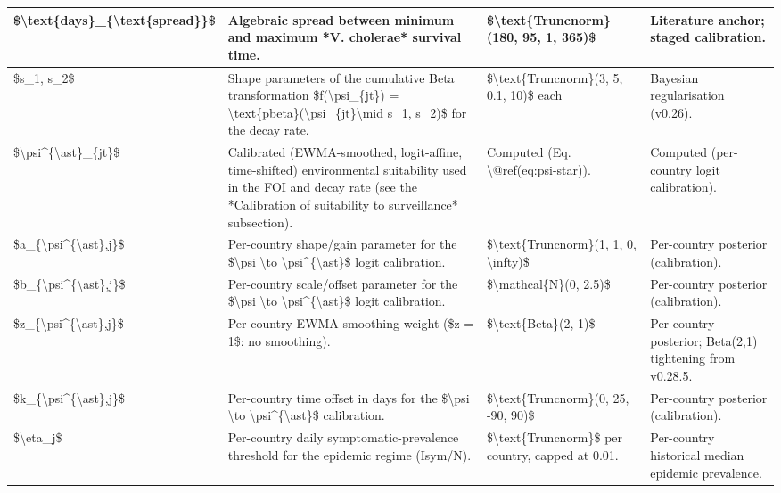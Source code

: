 \documentclass[
]{book}
\begin{document}
\begin{table}
\begin{tabular}[t]{l|l|l|l}
\hline
\$\textbackslash{}text\{days\}\_\{\textbackslash{}text\{spread\}\}\$ & Algebraic spread between minimum and maximum *V. cholerae* survival time. & \$\textbackslash{}text\{Truncnorm\}(180, 95, 1, 365)\$ & Literature anchor; staged calibration.\\
\hline
\$s\_1, s\_2\$ & Shape parameters of the cumulative Beta transformation \$f(\textbackslash{}psi\_\{jt\}) = \textbackslash{}text\{pbeta\}(\textbackslash{}psi\_\{jt\}\textbackslash{}mid s\_1, s\_2)\$ for the decay rate. & \$\textbackslash{}text\{Truncnorm\}(3, 5, 0.1, 10)\$ each & Bayesian regularisation (v0.26).\\
\hline
\$\textbackslash{}psi\textasciicircum{}\{\textbackslash{}ast\}\_\{jt\}\$ & Calibrated (EWMA-smoothed, logit-affine, time-shifted) environmental suitability used in the FOI and decay rate (see the *Calibration of suitability to surveillance* subsection). & Computed (Eq. \textbackslash{}@ref(eq:psi-star)). & Computed (per-country logit calibration).\\
\hline
\$a\_\{\textbackslash{}psi\textasciicircum{}\{\textbackslash{}ast\},j\}\$ & Per-country shape/gain parameter for the \$\textbackslash{}psi \textbackslash{}to \textbackslash{}psi\textasciicircum{}\{\textbackslash{}ast\}\$ logit calibration. & \$\textbackslash{}text\{Truncnorm\}(1, 1, 0, \textbackslash{}infty)\$ & Per-country posterior (calibration).\\
\hline
\$b\_\{\textbackslash{}psi\textasciicircum{}\{\textbackslash{}ast\},j\}\$ & Per-country scale/offset parameter for the \$\textbackslash{}psi \textbackslash{}to \textbackslash{}psi\textasciicircum{}\{\textbackslash{}ast\}\$ logit calibration. & \$\textbackslash{}mathcal\{N\}(0, 2.5)\$ & Per-country posterior (calibration).\\
\hline
\$z\_\{\textbackslash{}psi\textasciicircum{}\{\textbackslash{}ast\},j\}\$ & Per-country EWMA smoothing weight (\$z = 1\$: no smoothing). & \$\textbackslash{}text\{Beta\}(2, 1)\$ & Per-country posterior; Beta(2,1) tightening from v0.28.5.\\
\hline
\$k\_\{\textbackslash{}psi\textasciicircum{}\{\textbackslash{}ast\},j\}\$ & Per-country time offset in days for the \$\textbackslash{}psi \textbackslash{}to \textbackslash{}psi\textasciicircum{}\{\textbackslash{}ast\}\$ calibration. & \$\textbackslash{}text\{Truncnorm\}(0, 25, -90, 90)\$ & Per-country posterior (calibration).\\
\hline
\$\textbackslash{}eta\_j\$ & Per-country daily symptomatic-prevalence threshold for the epidemic regime (Isym/N). & \$\textbackslash{}text\{Truncnorm\}\$ per country, capped at 0.01. & Per-country historical median epidemic prevalence.\\

\end{tabular}
\end{table}
\end{document}
